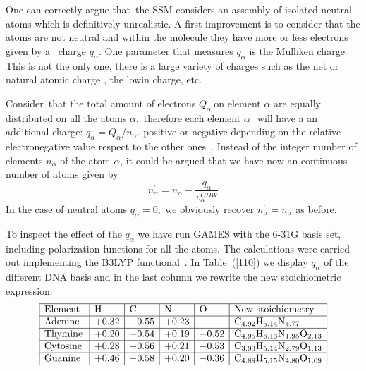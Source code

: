 \documentclass[preprint,12pt]{article}
\begin{document}
One can correctly argue that\ the SSM considers an assembly of isolated
neutral atoms which is definitively unrealistic. A first improvement is to
consider that the atoms are not neutral and within the molecule they have
more or less electrons given by a \ charge $q_{\alpha }$. One parameter that
measures $q_{\alpha }$ is the Mulliken charge. This is not the only one,
there is a large variety of charges such as the net or natural atomic charge 
\cite{lee2003}, the lowin charge, etc.

Consider\ that the total amount of electrons $Q_{\alpha }\ $on element $%
\alpha $ are equally distributed on all the atoms $\alpha ,$ therefore each
element $\alpha \ $\ will have a an additional charge: $q_{\alpha
}=Q_{\alpha }/n_{\alpha }$. positive or negative depending on the relative
electronegative value respect to the other ones~\cite{rappe1991}. Instead
of the integer number of elements $n_{\alpha }$ of the atom $\alpha$, it
could be argued that we have now an continuous number of atoms given by 
\begin{equation}
n_{\alpha }^{\prime }=n_{\alpha }-\frac{q_{\alpha }}{v_{\alpha }^{CDW}}
\label{100}
\end{equation}%
In the case of neutral atoms $q_{\alpha }=0,$ we obviously recover $%
n_{\alpha }^{\prime }=n_{\alpha }$ as before$.$

To inspect the effect of the $q_{\alpha }$ we have run GAMES with the 
6-31G basis set, including polarization functions for all the atoms. 
The calculations were carried out implementing the B3LYP 
functional~\cite{Becke1993,Stephens1994}. In Table~(\ref{110}) we display
$q_{\alpha }$ of the different DNA basis and in the last column we rewrite
the new stoichiometric expression. 
\begin{equation}
\begin{array}{|l|l|l|l|l|l|}
\hline
\text{Element}\,\,\, & \mathrm{H} & \mathrm{C} & \mathrm{N} & \mathrm{O} & 
\text{New stoichiometry} \\ 
\hline
\mathrm{Adenine}  & +0.32 & -0.55 & +0.23 &       & 
\mathrm{C}_{4.92}\mathrm{H}_{5.14}\mathrm{N}_{4.77} \\ 
\hline
\mathrm{Thymine}  & +0.20 & -0.54 & +0.19 & -0.52 & 
\mathrm{C}_{4.95}\mathrm{H}_{6.13}\mathrm{N}_{1.95}\mathrm{O}_{2.13} \\ 
\hline
\mathrm{Cytosine} & +0.28 & -0.56 & +0.21 & -0.53 & 
\mathrm{C}_{3.93}\mathrm{H}_{5.14}\mathrm{N}_{2.79}\mathrm{O}_{1.13} \\ 
\hline
\mathrm{Guanine}  & +0.46 & -0.58 & +0.20 & -0.36 & 
\mathrm{C}_{4.89}\mathrm{H}_{5.15}\mathrm{N}_{4.80}\mathrm{O}_{1.09} \\ 
\hline
\end{array}
\label{110}
\end{equation}
\end{document}
